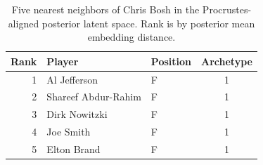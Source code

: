 \begin{table}[htbp]
  \centering\small
  \begin{tabular}{rllc}
    \toprule
    Rank & Player & Position & Archetype \\
    \midrule
    1 & Al Jefferson & F & 1 \\
    2 & Shareef Abdur-Rahim & F & 1 \\
    3 & Dirk Nowitzki & F & 1 \\
    4 & Joe Smith & F & 1 \\
    5 & Elton Brand & F & 1 \\
    \bottomrule
  \end{tabular}
  \caption{Five nearest neighbors of Chris Bosh in the Procrustes-aligned posterior latent space. Rank is by posterior mean embedding distance.}
  \label{tab:Chris_Bosh_neighbors}
\end{table}

